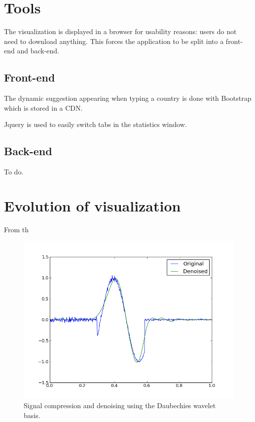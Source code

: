 \documentclass[10pt,conference,compsocconf]{IEEEtran}
\begin{document}
\section{Tools}
\label{sec:tools}

The visualization is displayed in a browser for usability reasons: users do not need to download anything. This forces the application to be split into a front-end and back-end.

\subsection{Front-end}

The dynamic suggestion appearing when typing a country is done with Bootstrap which is stored in a CDN.

Jquery is used to easily switch tabs in the statistics window.


\subsection{Back-end}

To do.

\section{Evolution of visualization}
\label{sec:evolution_of_visualization}
From th

\begin{figure}[tbp]
  \centering
  \includegraphics[width=\columnwidth]{local_wdenoised_1d}
  \vspace{-3mm}
  \caption{Signal compression and denoising using the Daubechies wavelet basis.}
  \label{fig:denoise-wavelet}
\end{figure}
\end{document}
